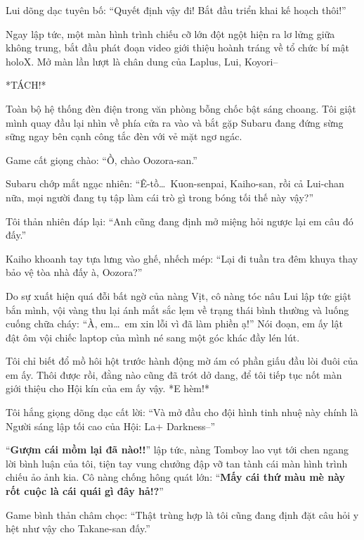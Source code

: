 \documentclass[../main.tex]{subfiles}
\begin{document}

Lui dõng dạc tuyên bố: ``Quyết định vậy đi! Bắt đầu triển khai kế hoạch thôi!''

Ngay lập tức, một màn hình trình chiếu cỡ lớn đột ngột hiện ra lơ lửng giữa không trung, bắt đầu phát đoạn video giới thiệu hoành tráng về tổ chức bí mật holoX. Mở màn lần lượt là chân dung của Laplus, Lui, Koyori--

*TÁCH!*

Toàn bộ hệ thống đèn điện trong văn phòng bỗng chốc bật sáng choang. Tôi giật mình quay đầu lại nhìn về phía cửa ra vào và bắt gặp Subaru đang đứng sừng sững ngay bên cạnh công tắc đèn với vẻ mặt ngơ ngác.


Game cất giọng chào: ``Ồ, chào Oozora-san.''

Subaru chớp mắt ngạc nhiên: ``Ê-tồ\dots\ Kuon-senpai, Kaiho-san, rồi cả Lui-chan nữa, mọi người đang tụ tập làm cái trò gì trong bóng tối thế này vậy?''

Tôi thản nhiên đáp lại: ``Anh cũng đang định mở miệng hỏi ngược lại em câu đó đấy.''

Kaiho khoanh tay tựa lưng vào ghế, nhếch mép: ``Lại đi tuần tra đêm khuya thay bảo vệ tòa nhà đấy à, Oozora?''

Do sự xuất hiện quá đỗi bất ngờ của nàng Vịt, cô nàng tóc nâu Lui lập tức giật bắn mình, vội vàng thu lại ánh mắt sắc lẹm về trạng thái bình thường và luống cuống chữa cháy: ``À, em\dots\ em xin lỗi vì đã làm phiền ạ!'' Nói đoạn, em ấy lật đật ôm vội chiếc laptop của mình né sang một góc khác đầy lén lút.

Tôi chỉ biết đổ mồ hôi hột trước hành động mờ ám có phần giấu đầu lòi đuôi của em ấy. Thôi được rồi, đằng nào cũng đã trót dở dang, để tôi tiếp tục nốt màn giới thiệu cho Hội kín của em ấy vậy. *E hèm!*

Tôi hắng giọng dõng dạc cất lời: ``Và mở đầu cho đội hình tinh nhuệ này chính là Người sáng lập tối cao của Hội: La+ Darkness--''

``\textbf{Gượm cái mồm lại đã nào!!}'' lập tức, nàng Tomboy lao vụt tới chen ngang lời bình luận của tôi, tiện tay vung chưởng đập vỡ tan tành cái màn hình trình chiếu ảo ảnh kia. Cô nàng chống hông quát lớn: ``\textbf{Mấy cái thứ màu mè này rốt cuộc là cái quái gì đây hả!?}''


Game bình thản châm chọc: ``Thật trùng hợp là tôi cũng đang định đặt câu hỏi y hệt như vậy cho Takane-san đấy.''
\end{document}
